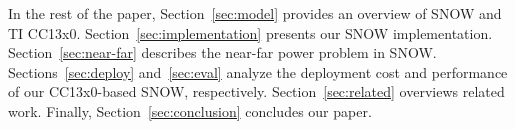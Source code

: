 

In the rest of the paper, Section~\ref{sec:model} provides an overview of SNOW and TI CC13x0. Section~\ref{sec:implementation} presents our SNOW implementation. Section~\ref{sec:near-far} describes the near-far power problem in SNOW. Sections~\ref{sec:deploy} and~\ref{sec:eval}  analyze the deployment cost and performance of our CC13x0-based SNOW, respectively. Section~\ref{sec:related} overviews related work. Finally, Section~\ref{sec:conclusion} concludes our paper.



















